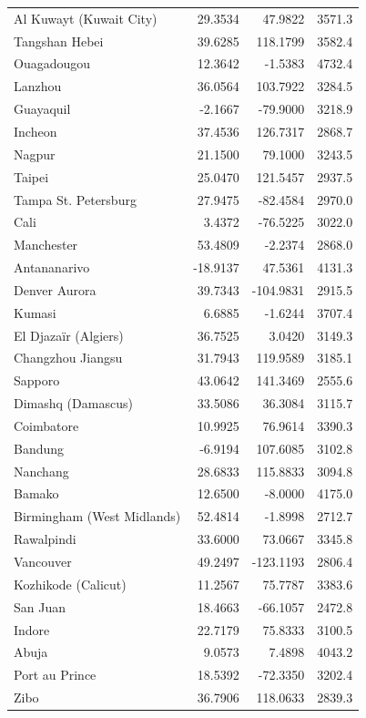 \begin{longtable}{lrrc}
Al Kuwayt (Kuwait City) & 29.3534 & 47.9822 & 3571.3 \\
Tangshan  Hebei & 39.6285 & 118.1799 & 3582.4 \\
Ouagadougou & 12.3642 & -1.5383 & 4732.4 \\
Lanzhou & 36.0564 & 103.7922 & 3284.5 \\
Guayaquil & -2.1667 & -79.9000 & 3218.9 \\
Incheon & 37.4536 & 126.7317 & 2868.7 \\
Nagpur & 21.1500 & 79.1000 & 3243.5 \\
Taipei & 25.0470 & 121.5457 & 2937.5 \\
Tampa St. Petersburg & 27.9475 & -82.4584 & 2970.0 \\
Cali & 3.4372 & -76.5225 & 3022.0 \\
Manchester & 53.4809 & -2.2374 & 2868.0 \\
Antananarivo & -18.9137 & 47.5361 & 4131.3 \\
Denver Aurora & 39.7343 & -104.9831 & 2915.5 \\
Kumasi & 6.6885 & -1.6244 & 3707.4 \\
El Djazaïr  (Algiers) & 36.7525 & 3.0420 & 3149.3 \\
Changzhou  Jiangsu & 31.7943 & 119.9589 & 3185.1 \\
Sapporo & 43.0642 & 141.3469 & 2555.6 \\
Dimashq (Damascus) & 33.5086 & 36.3084 & 3115.7 \\
Coimbatore & 10.9925 & 76.9614 & 3390.3 \\
Bandung & -6.9194 & 107.6085 & 3102.8 \\
Nanchang & 28.6833 & 115.8833 & 3094.8 \\
Bamako & 12.6500 & -8.0000 & 4175.0 \\
Birmingham (West Midlands) & 52.4814 & -1.8998 & 2712.7 \\
Rawalpindi & 33.6000 & 73.0667 & 3345.8 \\
Vancouver & 49.2497 & -123.1193 & 2806.4 \\
Kozhikode (Calicut) & 11.2567 & 75.7787 & 3383.6 \\
San Juan & 18.4663 & -66.1057 & 2472.8 \\
Indore & 22.7179 & 75.8333 & 3100.5 \\
Abuja & 9.0573 & 7.4898 & 4043.2 \\
Port au Prince & 18.5392 & -72.3350 & 3202.4 \\
Zibo & 36.7906 & 118.0633 & 2839.3 \\

\end{longtable}
